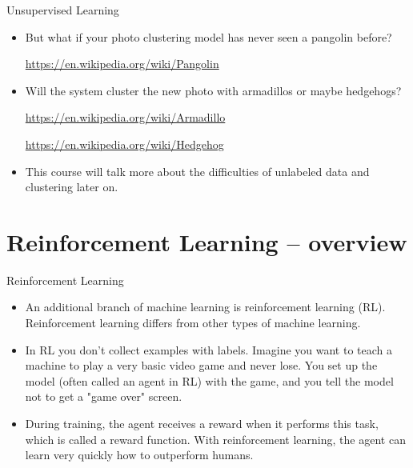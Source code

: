 \documentclass{beamer}
\begin{document}

\begin{frame}{Unsupervised Learning}

\begin{itemize}
\item But what if your photo clustering model has never seen a pangolin before? 

\url{https://en.wikipedia.org/wiki/Pangolin}

\item Will the system cluster the new photo with armadillos or maybe hedgehogs? 

\url{https://en.wikipedia.org/wiki/Armadillo}

\url{https://en.wikipedia.org/wiki/Hedgehog}

\item This course will talk more about the difficulties of unlabeled data and clustering later on.
\end{itemize}

\end{frame}


\section{Reinforcement Learning -- overview}

\begin{frame}{Reinforcement Learning}

\begin{itemize}
\item An additional branch of machine learning is reinforcement learning (RL). Reinforcement learning differs from other types of machine learning. 

\item In RL you don't collect examples with labels. Imagine you want to teach a machine to play a very basic video game and never lose. You set up the model (often called an agent in RL) with the game, and you tell the model not to get a "game over" screen. 

\item During training, the agent receives a reward when it performs this task, which is called a reward function. With reinforcement learning, the agent can learn very quickly how to outperform humans.
\end{itemize}

\end{frame}

\end{document}

